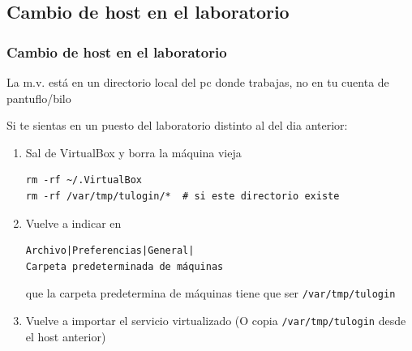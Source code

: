 \documentclass[ucs]{beamer}
\newcommand{\res}[1]{\textcolor{darkred}{#1}}
\begin{document}
%
%
%



%

\subsection{Cambio de host en el laboratorio}
\begin{frame}[fragile]
\frametitle{Cambio de host en el laboratorio}
La m.v. está en un directorio local del pc donde trabajas, no en tu cuenta
de pantuflo/bilo

Si te sientas en un puesto del laboratorio distinto al del dia anterior:
\begin{enumerate}
\item
Sal de VirtualBox y borra la máquina vieja
  \begin{footnotesize}
  \begin{verbatim}
rm -rf ~/.VirtualBox
rm -rf /var/tmp/tulogin/*  # si este directorio existe
  \end{verbatim}
  \end{footnotesize}

\item
Vuelve a indicar en 
\begin{scriptsize}
\begin{verbatim}
Archivo|Preferencias|General|
Carpeta predeterminada de máquinas
\end{verbatim}
\end{scriptsize}
que la carpeta predetermina de máquinas tiene que ser \verb|/var/tmp/tulogin|

\item
Vuelve a importar el servicio virtualizado
(O copia \verb|/var/tmp/tulogin| desde el host anterior)





\end{enumerate}

\end{frame}
\end{document}
